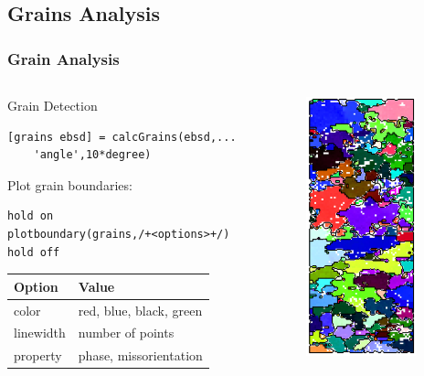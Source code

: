 \subsection*{Grains Analysis}

\begin{frame}[fragile]
  \frametitle{Grain Analysis}

  \begin{columns}
    \begin{column}{8.5cm}

      \medskip

      Grain Detection

\begin{lstlisting}
[grains ebsd] = calcGrains(ebsd,...
    'angle',10*degree)
\end{lstlisting}


\medskip

\pause

Plot grain boundaries:
\begin{lstlisting}
hold on
plotboundary(grains,/+<options>+/)
hold off
\end{lstlisting}

\begin{tabular}{ll}
  Option & Value \\
  \toprule
  color & red, blue, black, green\\
  linewidth & number of points\\
  property & phase, missorientation\\
\end{tabular}

\end{column}

\begin{column}{3.5cm}
  \includegraphics[height=7.5cm]{pic/ebsdgrains}
\end{column}
\end{columns}

\end{frame}


